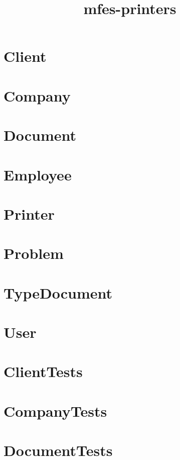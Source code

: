 \documentclass{article}
\begin{document}
\title{mfes-printers}
\author{}
\maketitle
\tableofcontents

\section{Client}

\section{Company}

\section{Document}

\section{Employee}

\section{Printer}

\section{Problem}

\section{TypeDocument}

\section{User}

\section{ClientTests}

\section{CompanyTests}

\section{DocumentTests}

\end{document}
